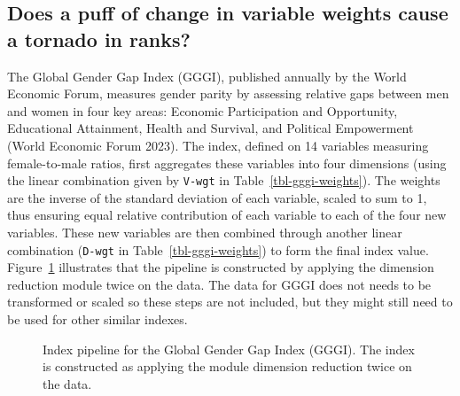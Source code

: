\documentclass[
]{interact}
\begin{document}
\subsection{Does a puff of change in variable weights cause a tornado in
ranks?}\label{does-a-puff-of-change-in-variable-weights-cause-a-tornado-in-ranks}

The Global Gender Gap Index (GGGI), published annually by the World
Economic Forum, measures gender parity by assessing relative gaps
between men and women in four key areas: Economic Participation and
Opportunity, Educational Attainment, Health and Survival, and Political
Empowerment (World Economic Forum 2023). The index, defined on 14
variables measuring female-to-male ratios, first aggregates these
variables into four dimensions (using the linear combination given by
\texttt{V-wgt} in Table~\ref{tbl-gggi-weights}). The weights are the
inverse of the standard deviation of each variable, scaled to sum to 1,
thus ensuring equal relative contribution of each variable to each of
the four new variables. These new variables are then combined through
another linear combination (\texttt{D-wgt} in
Table~\ref{tbl-gggi-weights}) to form the final index value.
Figure~\ref{fig-pp-gggi} illustrates that the pipeline is constructed by
applying the dimension reduction module twice on the data. The data for
GGGI does not needs to be transformed or scaled so these steps are not
included, but they might still need to be used for other similar
indexes.

\begin{figure}


\caption{\label{fig-pp-gggi}Index pipeline for the Global Gender Gap
Index (GGGI). The index is constructed as applying the module dimension
reduction twice on the data.}

\end{figure}%

\begingroup\fontsize{11}{13}\selectfont
\end{document}
